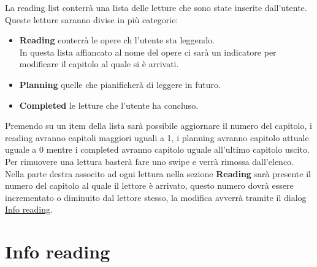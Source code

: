 \documentclass{report}
\begin{document}
La reading list conterrà una lista delle letture che sono state inserite dall'utente.\\
Queste letture saranno divise in più categorie:
\begin{itemize}
   \item \textbf{Reading} conterrà le opere ch l'utente sta leggendo.\\
   In questa lista affiancato al nome del opere ci sarà un indicatore per modificare il capitolo al quale si è arrivati.
   \item \textbf{Planning} quelle che pianificherà di leggere in futuro.
   \item \textbf{Completed} le letture che l'utente ha concluso.
\end{itemize}
Premendo su un item della lista sarà possibile aggiornare il numero del capitolo, i reading avranno capitoli maggiori uguali a 1, i planning avranno capitolo attuale uguale a 0 mentre i completed avranno capitolo uguale all'ultimo capitolo uscito.\\
Per rimuovere una lettura basterà fare uno swipe e verrà rimossa dall'elenco.\\
Nella parte destra associto ad ogni lettura nella sezione \textbf{Reading} sarà presente il numero del capitolo al quale il lettore è arrivato, questo numero dovrà essere incrementato o diminuito dal lettore stesso, la modifica avverrà tramite il dialog \hyperref[sec:info_reading]{Info reading}.

\section{Info reading}\label{sec:info_reading}
\end{document}
